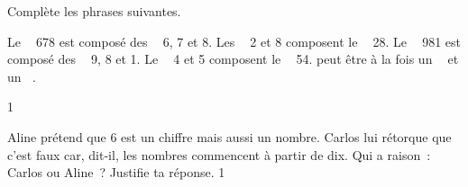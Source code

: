 \documentclass[a4paper,11pt]{report}
\begin{document}
\begin{exop}{
Complète les phrases suivantes.
\begin{tasks}[after-item-skip = 0.5em]
\task Le $\;$\hrulefill$\;$ 678 est composé des $\;$\hrulefill$\;$ 6, 7 et 8.
\task Les $\;$\hrulefill$\;$ 2 et 8 composent le $\;$\hrulefill$\;$ 28.
\task Le $\;$\hrulefill$\;$ 981 est composé des $\;$\hrulefill$\;$ 9, 8 et 1.
\task Le $\;$\hrulefill$\;$ 4 et 5 composent le $\;$\hrulefill$\;$ 54.
 peut être à la fois un $\;$\hrulefill$\;$ et un $\;$\hrulefill$\;$.
\end{tasks}
}{1}\end{exop}

\begin{exo}{
Aline prétend que 6 est un chiffre mais aussi un nombre. Carlos lui rétorque que c'est faux car, dit-il, les nombres commencent à partir de dix. Qui a raison~: Carlos ou Aline~? Justifie ta réponse.
}{1}\end{exo}
\end{document}
